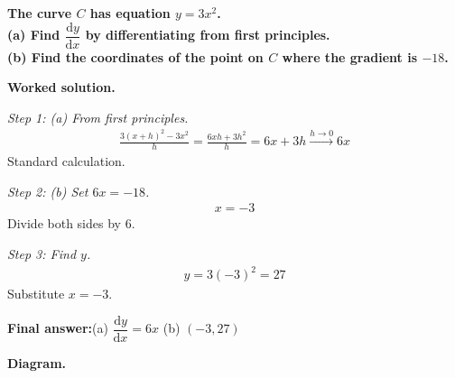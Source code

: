 \documentclass[11pt]{article}
\newcommand{\question}[1]{\par\medskip\noindent\textbf{#1}\par}
\begin{document}
\question{The curve \( C \) has equation \( y = 3x^2 \).\\[3pt]  (a) Find \( \dfrac{\mathrm{d}y}{\mathrm{d}x} \) by differentiating from first principles.\\[3pt]  (b) Find the coordinates of the point on \( C \) where the gradient is \( -18 \).}

\textbf{Worked solution.}

\textit{Step 1: (a) From first principles.}
\[\begin{gathered}
\frac{3(x+h)^2 - 3x^2}{h} = \frac{6xh + 3h^2}{h} = 6x + 3h \xrightarrow{h\to 0} 6x
\end{gathered}\]
Standard calculation.

\textit{Step 2: (b) Set \( 6x = -18 \).}
\[\begin{gathered}
x = -3
\end{gathered}\]
Divide both sides by 6.

\textit{Step 3: Find \( y \).}
\[\begin{gathered}
y = 3(-3)^2 = 27
\end{gathered}\]
Substitute \( x = -3 \).

\begin{answerbox}
\textbf{Final answer:}\quad (a) \(\displaystyle  \dfrac{\mathrm{d}y}{\mathrm{d}x} = 6x \) \quad  (b) \(\displaystyle  (-3, 27) \)
\end{answerbox}
\textbf{Diagram.}
\end{document}
